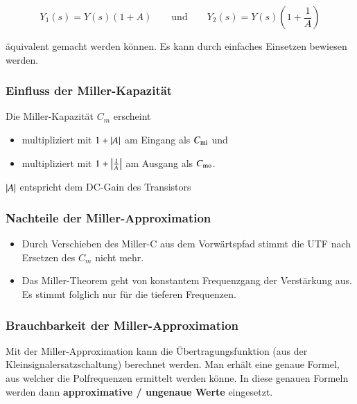 \[
    Y_1(s) = Y(s) (1+A) \qquad \text{und} \qquad Y_2(s) = Y(s) \left( 1+\frac{1}{A} \right)
\]

\vspace{-0.1cm}

äquivalent gemacht werden können.
Es kann durch einfaches Einsetzen bewiesen werden.


\subsubsection{Einfluss der Miller-Kapazität}

Die Miller-Kapazität $C_m$ erscheint 

\smallskip

\begin{minipage}[t]{0.6\columnwidth}
    \begin{itemize}
        \item multipliziert mit $1+\left|A\right|$ am Eingang als $C_{\rm mi}$ und
        \item multipliziert mit $1+\left|\frac{1}{A}\right|$ am Ausgang als $C_{\rm mo}$.
    \end{itemize}
\end{minipage}
\hfill
\begin{minipage}[t]{0.33\columnwidth}
    $\left|A\right|$ entspricht dem DC-Gain des Transistors
\end{minipage}



\subsubsection{Nachteile der Miller-Approximation}
 
\begin{itemize}
    \item Durch Verschieben des Miller-C aus dem Vorwärtspfad stimmt die UTF nach Ersetzen des $C_m$ nicht mehr.
    \item Das Miller-Theorem geht von konstantem Frequenzgang der Verstärkung aus. Es stimmt folglich nur für die tieferen Frequenzen.
\end{itemize}


\subsubsection{Brauchbarkeit der Miller-Approximation}

Mit der Miller-Approximation kann die Übertragungsfunktion (aus der Kleinsignalersatzschaltung) berechnet werden.
Man erhält eine genaue Formel, aus welcher die Polfrequenzen ermittelt werden könne.
In diese genauen Formeln werden dann \textbf{approximative / ungenaue Werte} eingesetzt.


